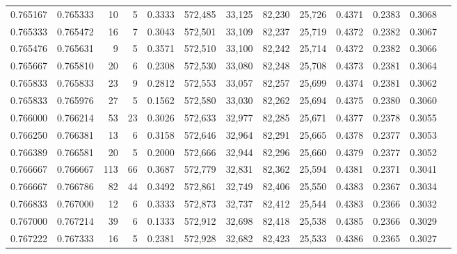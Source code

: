 \begin{tabular}{rrrrrrrrrrrrr}
0.765167 & 0.765333 &    10 &   5 &                                     0.3333 & 572,485 &  33,125 &  82,230 &  25,726 & 0.4371 & 0.2383 & 0.3068 \\
0.765333 & 0.765472 &    16 &   7 &                                     0.3043 & 572,501 &  33,109 &  82,237 &  25,719 & 0.4372 & 0.2382 & 0.3067 \\
0.765476 & 0.765631 &     9 &   5 &                                     0.3571 & 572,510 &  33,100 &  82,242 &  25,714 & 0.4372 & 0.2382 & 0.3066 \\
0.765667 & 0.765810 &    20 &   6 &                                     0.2308 & 572,530 &  33,080 &  82,248 &  25,708 & 0.4373 & 0.2381 & 0.3064 \\
0.765833 & 0.765833 &    23 &   9 &                                     0.2812 & 572,553 &  33,057 &  82,257 &  25,699 & 0.4374 & 0.2381 & 0.3062 \\
0.765833 & 0.765976 &    27 &   5 &                                     0.1562 & 572,580 &  33,030 &  82,262 &  25,694 & 0.4375 & 0.2380 & 0.3060 \\
0.766000 & 0.766214 &    53 &  23 &                                     0.3026 & 572,633 &  32,977 &  82,285 &  25,671 & 0.4377 & 0.2378 & 0.3055 \\
0.766250 & 0.766381 &    13 &   6 &                                     0.3158 & 572,646 &  32,964 &  82,291 &  25,665 & 0.4378 & 0.2377 & 0.3053 \\
0.766389 & 0.766581 &    20 &   5 &                                     0.2000 & 572,666 &  32,944 &  82,296 &  25,660 & 0.4379 & 0.2377 & 0.3052 \\
0.766667 & 0.766667 &   113 &  66 &                                     0.3687 & 572,779 &  32,831 &  82,362 &  25,594 & 0.4381 & 0.2371 & 0.3041 \\
0.766667 & 0.766786 &    82 &  44 &                                     0.3492 & 572,861 &  32,749 &  82,406 &  25,550 & 0.4383 & 0.2367 & 0.3034 \\
0.766833 & 0.767000 &    12 &   6 &                                     0.3333 & 572,873 &  32,737 &  82,412 &  25,544 & 0.4383 & 0.2366 & 0.3032 \\
0.767000 & 0.767214 &    39 &   6 &                                     0.1333 & 572,912 &  32,698 &  82,418 &  25,538 & 0.4385 & 0.2366 & 0.3029 \\
0.767222 & 0.767333 &    16 &   5 &                                     0.2381 & 572,928 &  32,682 &  82,423 &  25,533 & 0.4386 & 0.2365 & 0.3027 \\

\end{tabular}
